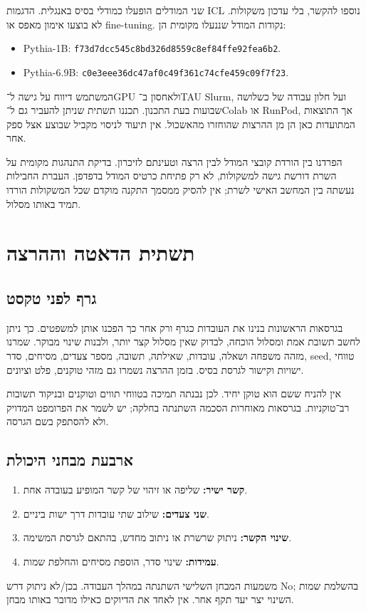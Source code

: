 \documentclass[11pt,a4paper]{article}
\newcommand{\en}[1]{\textenglish{#1}}
\begin{document}
שני המודלים הופעלו כמודלי בסיס באנגלית. הדגמות \en{ICL} נוספו להקשר, בלי עדכון משקולות. לא בוצעו אימון מאפס או \en{fine-tuning}. נקודות המודל שננעלו מקומית הן:
\begin{english}\small
\begin{itemize}
\item Pythia-1B: \texttt{f73d7dcc545c8bd326d8559c8ef84ffe92fea6b2}.
\item Pythia-6.9B: \texttt{c0e3eee36dc47af0c49f361c74cfe459c09f7f23}.
\end{itemize}
\end{english}

המשתמש דיווח על גישה ל־\en{GPU} ולאחסון ב־\en{TAU Slurm}, ועל חלון עבודה של כשלושה שבועות בעת התכנון. תכננו תשתית שניתן להעביר גם ל־\en{Colab} או \en{RunPod}, אך התוצאות המתועדות כאן הן מן ההרצות שהוחזרו מהאשכול. אין תיעוד לניסוי מקביל שבוצע אצל ספק אחר.

הפרדנו בין הורדת קובצי המודל לבין הרצה וטעינתם לזיכרון. בדיקת התנהגות מקומית על השרת דורשת גישה למשקולות, לא רק פתיחת כרטיס המודל בדפדפן. העברת החבילות נעשתה בין המחשב האישי לשרת; אין להסיק ממסמך התקנה מוקדם שכל המשקולות הורדו תמיד באותו מסלול.

\section{תשתית הדאטה וההרצה}
\subsection{גרף לפני טקסט}
בגרסאות הראשונות בנינו את העובדות כגרף ורק אחר כך הפכנו אותן למשפטים. כך ניתן לחשב תשובת אמת ומסלול הוכחה, לבדוק שאין מסלול קצר יותר, ולבנות שינוי מבוקר. שמרנו מזהה משפחה ושאלה, עובדות, שאילתה, תשובה, מספר צעדים, מסיחים, סדר, \en{seed}, טווחי ישויות וקישור לגרסת בסיס. בזמן ההרצה נשמרו גם מזהי טוקנים, פלט וציונים.

אין להניח ששם הוא טוקן יחיד. לכן נבנתה תמיכה בטווחי תווים וטוקנים ובניקוד תשובות רב־טוקניות. בגרסאות מאוחרות הסכמה השתנתה בחלקה; יש לשמר את הפרומפט המדויק ולא להסתפק בשם הגרסה.

\subsection{ארבעת מבחני היכולת}
\begin{enumerate}
\item \textbf{קשר ישיר:} שליפה או זיהוי של קשר המופיע בעובדה אחת.
\item \textbf{שני צעדים:} שילוב שתי עובדות דרך ישות ביניים.
\item \textbf{שינוי הקשר:} ניתוק שרשרת או ניתוב מחדש, בהתאם לגרסת המשימה.
\item \textbf{עמידות:} שינוי סדר, הוספת מסיחים והחלפת שמות.
\end{enumerate}
משמעות המבחן השלישי השתנתה במהלך העבודה. בכן/לא ניתוק דרש \en{No}; בהשלמת שמות השינוי יצר יעד תקף אחר. אין לאחד את הדיוקים כאילו מדובר באותו מבחן.
\end{document}

